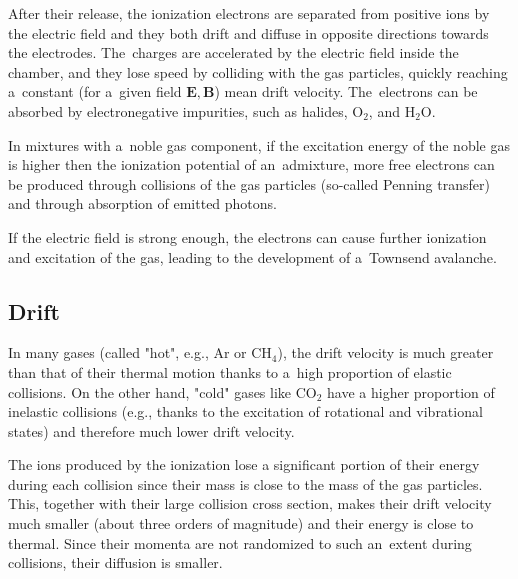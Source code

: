 		After their release, the ionization electrons are separated from positive ions by the electric field and they both drift and diffuse in opposite directions towards the electrodes. The~charges are accelerated by the electric field inside the chamber, and they lose speed by colliding with the gas particles, quickly reaching a~constant (for a~given field $\mathbf{E}, \mathbf{B}$) mean drift velocity. The~electrons can be absorbed by electronegative impurities, such as halides, O$_2$, and H$_2$O.
		
		In mixtures with a~noble gas component, if the excitation energy of the noble gas is higher then the ionization potential of an~admixture, more free electrons can be produced through collisions of the gas particles (so\nobreakdash-called Penning transfer) and through absorption of emitted photons.
		
		If the electric field is strong enough, the electrons can cause further ionization and excitation of the gas, leading to the development of a~Townsend avalanche.
	
		\subsection{Drift}			
			In many gases (called "hot", e.g., Ar or CH$_4$), the drift velocity is much greater than that of their thermal motion thanks to a~high proportion of elastic collisions. On the other hand, "cold" gases like CO$_2$ have a higher proportion of inelastic collisions (e.g., thanks to the excitation of rotational and vibrational states) and therefore much lower drift velocity.
			
			The ions produced by the ionization lose a significant portion of their energy during each collision since their mass is close to the mass of the gas particles. This, together with their large collision cross section, makes their drift velocity much smaller (about three orders of magnitude) and their energy is close to thermal. Since their momenta are not randomized to such an~extent during collisions, their diffusion is smaller.
			
